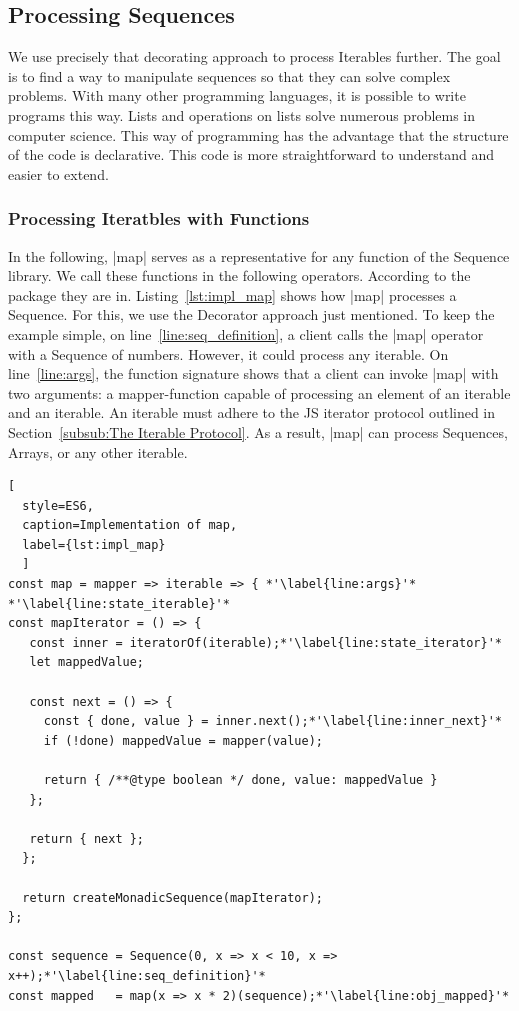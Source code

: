 \subsection{Processing Sequences}
\label{sec:Processing Sequences}
We use precisely that decorating approach to process Iterables further. 
The goal is to find a way to manipulate sequences so that they can solve 
complex problems. With many other programming languages, it is possible to write 
programs this way. Lists and operations on lists solve numerous problems in 
computer science. This way of programming has the advantage that the structure 
of the code is declarative. This code is more straightforward to understand 
and easier to extend.

\subsubsection{Processing Iteratbles with Functions}
\label{subsub:Processing Iteratbles with Functions}
In the following, |map| serves as a representative for any function of the
Sequence library. We call these functions in the following operators.
According to the package they are in.
Listing~\ref{lst:impl_map} shows how |map| processes a 
Sequence. For this, we use the Decorator approach just mentioned. To keep the 
example simple, on line~\ref{line:seq_definition}, a client calls the |map| 
operator with a Sequence of numbers. However, it could process any iterable.
\newline
On line~\ref{line:args}, the function signature shows that a client can invoke 
|map| with two arguments: a mapper-function capable of processing an element of 
an iterable and an iterable. An iterable must adhere to the JS iterator protocol 
outlined in Section~\ref{subsub:The Iterable Protocol}. As a result, |map| can 
process Sequences, Arrays, or any other iterable. 

\begin{lstlisting}[
  style=ES6, 
  caption=Implementation of map,
  label={lst:impl_map}
  ]
const map = mapper => iterable => { *'\label{line:args}'*
*'\label{line:state_iterable}'*
const mapIterator = () => {
   const inner = iteratorOf(iterable);*'\label{line:state_iterator}'*
   let mappedValue;
 
   const next = () => {
     const { done, value } = inner.next();*'\label{line:inner_next}'*
     if (!done) mappedValue = mapper(value);
 
     return { /**@type boolean */ done, value: mappedValue }
   };
 
   return { next };
  };
 
  return createMonadicSequence(mapIterator);
};

const sequence = Sequence(0, x => x < 10, x => x++);*'\label{line:seq_definition}'*
const mapped   = map(x => x * 2)(sequence);*'\label{line:obj_mapped}'*
\end{lstlisting}


